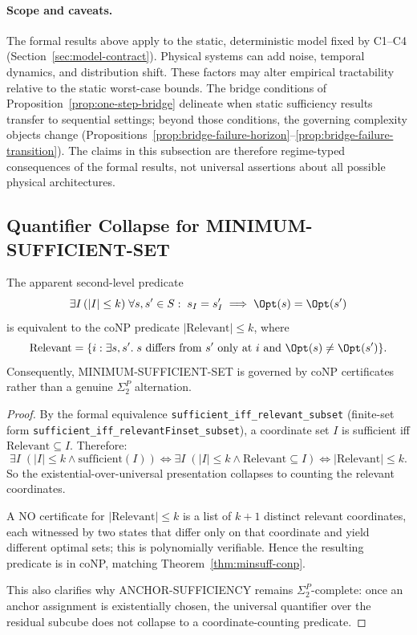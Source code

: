 \paragraph{Scope and caveats.}
The formal results above apply to the static, deterministic model fixed by C1--C4 (Section~\ref{sec:model-contract}). Physical systems can add noise, temporal dynamics, and distribution shift. These factors may alter empirical tractability relative to the static worst-case bounds. The bridge conditions of Proposition~\ref{prop:one-step-bridge} delineate when static sufficiency results transfer to sequential settings; beyond those conditions, the governing complexity objects change (Propositions~\ref{prop:bridge-failure-horizon}--\ref{prop:bridge-failure-transition}). The claims in this subsection are therefore regime-typed consequences of the formal results, not universal assertions about all possible physical architectures.

\subsection{Quantifier Collapse for MINIMUM-SUFFICIENT-SET}

\begin{theorem}
\label{thm:minsuff-collapse}
The apparent second-level predicate
\[
\exists I \, (|I| \leq k) \; \forall s,s' \in S:\; s_I = s'_I \implies \Opt(s)=\Opt(s')
\]
is equivalent to the coNP predicate $|\text{Relevant}| \le k$, where
\[
\text{Relevant} = \{i : \exists s,s'.\; s \text{ differs from } s' \text{ only at } i \text{ and } \Opt(s)\neq\Opt(s')\}.
\]
Consequently, MINIMUM-SUFFICIENT-SET is governed by coNP certificates rather than a genuine $\Sigma_2^P$ alternation.
\end{theorem}

\begin{proof}
By the formal equivalence \texttt{sufficient\_iff\_relevant\_subset} (finite-set form \texttt{sufficient\_iff\_relevantFinset\_subset}), a coordinate set $I$ is sufficient iff $\text{Relevant}\subseteq I$. Therefore:
\[
\exists I \; (|I|\le k \wedge \text{sufficient}(I))
\iff
\exists I \; (|I|\le k \wedge \text{Relevant}\subseteq I)
\iff
|\text{Relevant}| \le k.
\]
So the existential-over-universal presentation collapses to counting the relevant coordinates.

A NO certificate for $|\text{Relevant}| \le k$ is a list of $k+1$ distinct relevant coordinates, each witnessed by two states that differ only on that coordinate and yield different optimal sets; this is polynomially verifiable. Hence the resulting predicate is in coNP, matching Theorem~\ref{thm:minsuff-conp}.

This also clarifies why ANCHOR-SUFFICIENCY remains $\Sigma_2^P$-complete: once an anchor assignment is existentially chosen, the universal quantifier over the residual subcube does not collapse to a coordinate-counting predicate.
\end{proof}
